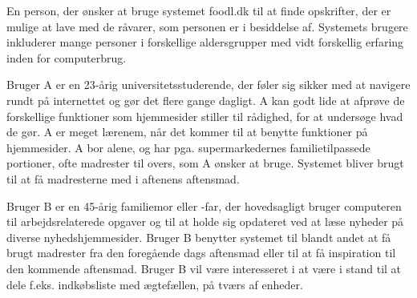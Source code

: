 {En person, der ønsker at bruge systemet foodl.dk til at finde opskrifter, der er mulige at lave med de råvarer, som personen er i besiddelse af.}
{Systemets brugere inkluderer mange personer i forskellige aldersgrupper med vidt forskellig erfaring inden for computerbrug.}
{Bruger A er en 23-årig universitetsstuderende, der føler sig sikker med at navigere rundt på internettet og gør det flere gange dagligt. A kan godt lide at afprøve de forskellige funktioner som hjemmesider stiller til rådighed, for at undersøge hvad de gør. A er meget lærenem, når det kommer til at benytte funktioner på hjemmesider. A bor alene, og har pga. supermarkedernes familietilpassede portioner, ofte madrester til overs, som A ønsker at bruge. Systemet bliver brugt til at få madresterne med i aftenens aftensmad.
 
Bruger B er en 45-årig familiemor eller -far, der hovedsagligt bruger computeren til arbejdsrelaterede opgaver og til at holde sig opdateret ved at læse nyheder på diverse nyhedshjemmesider. Bruger B benytter systemet til blandt andet at få brugt madrester fra den foregående dags aftensmad eller til at få inspiration til den kommende aftensmad. Bruger B vil være interesseret i at være i stand til at dele f.eks. indkøbsliste med ægtefællen, på tværs af enheder.}
